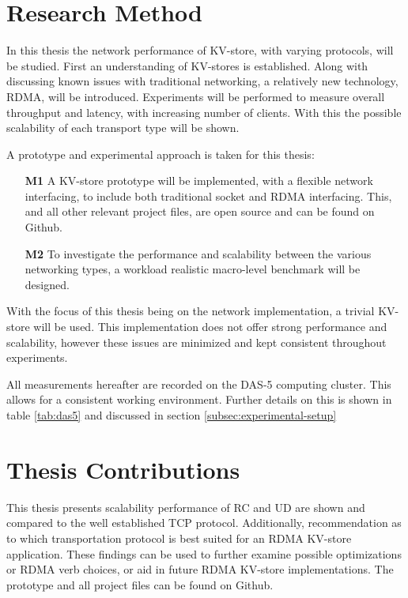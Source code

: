 \section{Research Method}
In this thesis the network performance of KV-store, with varying protocols, will be studied. 
First an understanding of KV-stores is established.
Along with discussing known issues with traditional networking, a relatively new technology, RDMA, will be introduced.
Experiments will be performed to measure overall throughput and latency, with increasing number of clients.
With this the possible scalability of each transport type will be shown.

A prototype\cite{iosup2019atlarge,hamming1998art,peffers2007design} and experimental\cite{jain1990art,heiser2010,ousterhout2018always} approach is taken for this thesis:
\begin{itemize}
    \item[\textbf{M1}] A KV-store prototype will be implemented, with a flexible network interfacing, to include both traditional socket and RDMA interfacing.
    This, and all other relevant project files, are open source and can be found on Github\cite{github}.
    \item[\textbf{M2}] To investigate the performance and scalability between the various networking types, a workload realistic\cite{atikoglu2012workload} macro-level benchmark will be designed.
\end{itemize}

With the focus of this thesis being on the network implementation, a trivial KV-store will be used.
This implementation does not offer strong performance and scalability, however these issues are minimized and kept consistent throughout experiments.

All measurements hereafter are recorded on the DAS-5 computing cluster.
This allows for a consistent working environment.
Further details on this is shown in table \ref{tab:das5} and discussed in section \ref{subsec:experimental-setup}

\section{Thesis Contributions}
This thesis presents scalability performance of RC and UD are shown and compared to the well established TCP protocol.
Additionally, recommendation as to which transportation protocol is best suited for an RDMA KV-store application.
These findings can be used to further examine possible optimizations or RDMA verb choices, or aid in future RDMA KV-store implementations.
The prototype and all project files can be found on Github\cite{github}.

